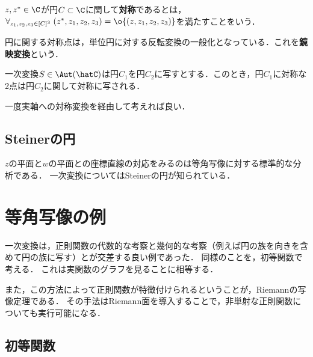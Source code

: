 \documentclass[uplatex, dvipdfmx]{jsreport}
\begin{document}
\begin{definition}
    $z,z^*\in\C$が円$C\subset\C$に関して\textbf{対称}であるとは，$\forall_{z_1,z_2,z_3\in[C]^3}\;(z^*,z_1,z_2,z_3)=\o{(z,z_1,z_2,z_3)}$を満たすことをいう．
\end{definition}
\begin{remarks}
    円に関する対称点は，単位円に対する反転変換の一般化となっている．これを\textbf{鏡映変換}という．
\end{remarks}

\begin{theorem}[対称の原理]
    一次変換$S\in\Aut(\hatC)$は円$C_1$を円$C_2$に写すとする．このとき，円$C_1$に対称な2点は円$C_2$に関して対称に写される．
\end{theorem}
\begin{Proof}
    一度実軸への対称変換を経由して考えれば良い．
\end{Proof}

\subsection{Steinerの円}

\begin{tcolorbox}[colframe=ForestGreen, colback=ForestGreen!10!white,breakable,colbacktitle=ForestGreen!40!white,coltitle=black,fonttitle=\bfseries\sffamily,
title=]
    $z$の平面と$w$の平面との座標直線の対応をみるのは等角写像に対する標準的な分析である．
    一次変換についてはSteinerの円が知られている．
\end{tcolorbox}

\section{等角写像の例}

\begin{tcolorbox}[colframe=ForestGreen, colback=ForestGreen!10!white,breakable,colbacktitle=ForestGreen!40!white,coltitle=black,fonttitle=\bfseries\sffamily,
title=]
    一次変換は，正則関数の代数的な考察と幾何的な考察（例えば円の族を向きを含めて円の族に写す）とが交差する良い例であった．
    同様のことを，初等関数で考える．
    これは実関数のグラフを見ることに相等する．

    また，この方法によって正則関数が特徴付けられるということが，Riemannの写像定理である．
    その手法はRiemann面を導入することで，非単射な正則関数についても実行可能になる．
\end{tcolorbox}

\subsection{初等関数}
\end{document}
